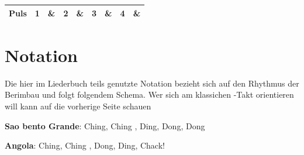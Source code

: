 \documentclass[fontsize=14pt, paper=a4, twoside, DIV=20]{scrreprt} %
\begin{document}
{\begin{center}
\begin{tabularx}{\textwidth}{|c|c|X|X|X|X|X|X|X|X|}
        \multicolumn{2}{|c|}{Puls}        & \textbf{ 1} & \textbf{\&}           & \textbf{2} & \textbf{\&}          & \textbf{3}          & \textbf{\&}           & \textbf{4} & \textbf{\&}            \\ \hline
\end{tabularx}
\end{center}


}





\chapter*{Notation}
Die hier im Liederbuch teils genutzte Notation bezieht sich auf den Rhythmus der Berimbau und folgt folgendem Schema. Wer sich am klassichen -Takt orientieren will kann auf die vorherige Seite schauen

\textbf{Sao bento Grande}: Ching,  Ching , Ding, Dong, Dong

\textbf{Angola}: Ching,  Ching , Dong, Ding, Chack!
\end{document}
